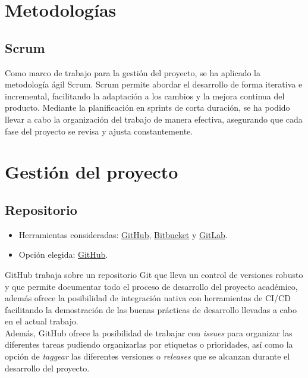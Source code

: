 
\section{Metodologías}\label{metodologias}

\subsection{Scrum}\label{scrum}
Como marco de trabajo para la gestión del proyecto, se ha aplicado la metodología ágil Scrum. Scrum permite abordar el desarrollo de forma iterativa e incremental, facilitando la adaptación a los cambios y la mejora continua del producto. Mediante la planificación en sprints de corta duración, se ha podido llevar a cabo la organización del trabajo de manera efectiva, asegurando que cada fase del proyecto se revisa y ajusta constantemente.\\

\section{Gestión del proyecto}\label{gestion-del-proyecto}

\subsection{Repositorio}\label{repositorio}

\begin{itemize}
\tightlist
\item
  Herramientas consideradas: \href{https://github.com/}{GitHub},
  \href{https://bitbucket.org/}{Bitbucket} y
  \href{https://gitlab.com/}{GitLab}.
\item
  Opción elegida: \href{https://github.com/}{GitHub}.
\end{itemize}

GitHub trabaja sobre un repositorio Git que lleva un control de versiones robusto y que permite documentar todo el proceso de desarrollo del proyecto académico, además ofrece la posibilidad de integración nativa con herramientas de CI/CD facilitando la demostración de las buenas prácticas de desarrollo llevadas a cabo en el actual trabajo.\\
Además, GitHub ofrece la posibilidad de trabajar con \emph{issues} para organizar las diferentes tareas pudiendo organizarlas por etiquetas o prioridades, así como la opción de \emph{taggear} las diferentes versiones o \emph{releases} que se alcanzan durante el desarrollo del proyecto.

